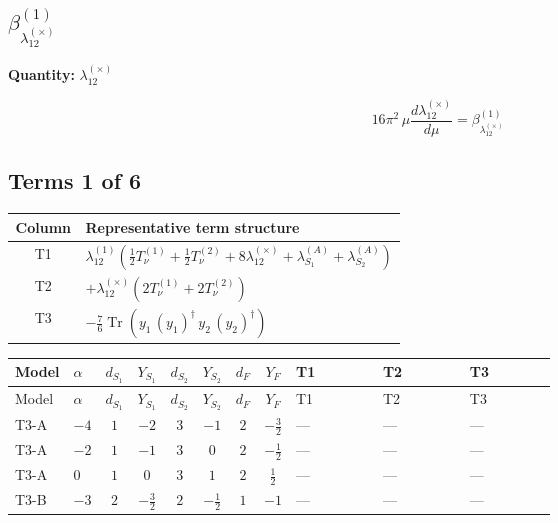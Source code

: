 \documentclass[8pt]{article}
\begin{document}
\begin{landscape}
\section*{$\beta_{\lambda_{12}^{(\times)}}^{(1)}$}
\noindent\textbf{Quantity: }$\lambda_{12}^{(\times)}$\par\smallskip
\[16\pi^2\,\mu\frac{d \lambda_{12}^{(\times)}}{d\mu}=\beta_{\lambda_{12}^{(\times)}}^{(1)}\]
\subsection*{Terms 1 of 6}
\begin{center}
\begin{tabular}{@{}c >{\raggedright\arraybackslash}p{0.82\linewidth}@{}}
\toprule
Column & Representative term structure \\
\midrule
T1 & \(\displaystyle {\lambda_{12}^{(1)}} \left(\frac{1}{2} T_{\nu}^{(1)}+\frac{1}{2} T_{\nu}^{(2)}+8 {\lambda_{12}^{(\times)}}+{\lambda_{S_1}^{(A)}}+{\lambda_{S_2}^{(A)}}\right)\) \\
\midrule
T2 & \(\displaystyle +{\lambda_{12}^{(\times)}} (2 T_{\nu}^{(1)}+2 T_{\nu}^{(2)})\) \\
\midrule
T3 & \(\displaystyle -\frac{7}{6} \operatorname{Tr}\!\left({y_1}\,\left({y_1}\right)^{\dagger}\,{y_2}\,\left({y_2}\right)^{\dagger}\right)\) \\
\midrule
\bottomrule
\end{tabular}
\end{center}
\smallskip
\tiny
\begin{longtable}{@{}llcccccc >{\raggedright\arraybackslash}p{0.21\linewidth} >{\raggedright\arraybackslash}p{0.21\linewidth} >{\raggedright\arraybackslash}p{0.21\linewidth}@{}}
\toprule
Model & $\alpha$ & $d_{S_1}$ & $Y_{S_1}$ & $d_{S_2}$ & $Y_{S_2}$ & $d_F$ & $Y_F$ & T1 & T2 & T3 \\
\midrule
\endfirsthead
\toprule
Model & $\alpha$ & $d_{S_1}$ & $Y_{S_1}$ & $d_{S_2}$ & $Y_{S_2}$ & $d_F$ & $Y_F$ & T1 & T2 & T3 \\
\midrule
\endhead
T3-A & $-4$ & $1$ & $-2$ & $3$ & $-1$ & $2$ & $-\frac{3}{2}$ & --- & --- & --- \\
\midrule
T3-A & $-2$ & $1$ & $-1$ & $3$ & $0$ & $2$ & $-\frac{1}{2}$ & --- & --- & --- \\
\midrule
T3-A & $0$ & $1$ & $0$ & $3$ & $1$ & $2$ & $\frac{1}{2}$ & --- & --- & --- \\
\midrule
T3-B & $-3$ & $2$ & $-\frac{3}{2}$ & $2$ & $-\frac{1}{2}$ & $1$ & $-1$ & --- & --- & --- \\

\end{longtable}
\end{landscape}
\end{document}
